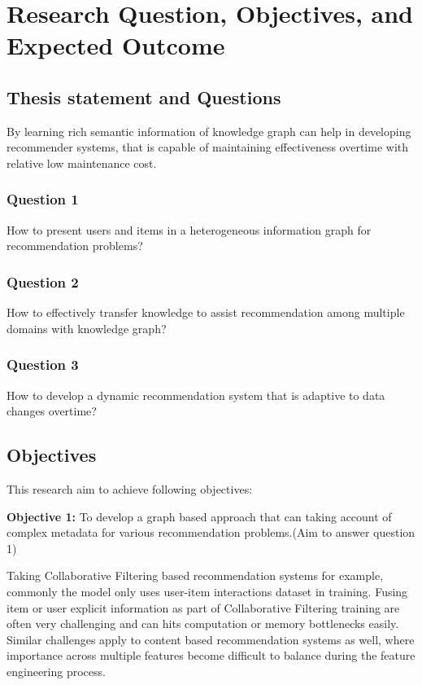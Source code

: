 
\section{Research Question, Objectives, and Expected Outcome}

\subsection{Thesis statement and Questions}
By learning rich semantic information of knowledge graph can help in developing recommender systems, that is capable of maintaining effectiveness overtime with relative low maintenance cost. 

\subsubsection*{Question 1}
How to present users and items in a heterogeneous information graph for recommendation problems?

\subsubsection*{Question 2}
How to effectively transfer knowledge to assist recommendation among multiple domains with knowledge graph?

\subsubsection*{Question 3}
How to develop a dynamic recommendation system that is adaptive to data changes overtime?

\subsection{Objectives}
This research aim to achieve following objectives: 

\bigskip
\textbf{Objective 1:} To develop a graph based approach that can taking account of complex metadata for various recommendation problems.(Aim to answer question 1)

Taking Collaborative Filtering based recommendation systems for example, commonly the model only uses user-item interactions dataset in training. Fusing item or user explicit information as part of Collaborative Filtering training are often very challenging and can hits computation or memory bottlenecks easily. Similar challenges apply to content based recommendation systems as well, where importance across multiple features become difficult to balance during the feature engineering process.

